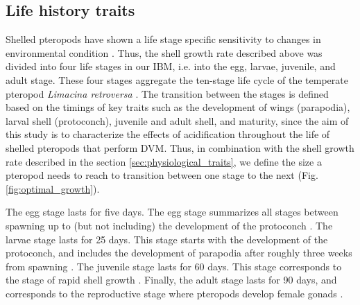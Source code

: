     
       
    


\subsection{Life history traits}\label{sec:life_history_traits}

Shelled pteropods have shown a  life stage specific sensitivity to changes in environmental condition \citep{Thabet2015Lifestages,Bednarsek2016CumulativeEffects}. Thus, the shell growth rate described above was divided into four life stages in our IBM, i.e. into the egg, larvae, juvenile, and adult stage. These four stages aggregate the ten-stage life cycle of the temperate pteropod \textit{Limacina retroversa} \citep{Howes2014Lab,Thabet2015Lifestages}. The transition between the stages is defined based on the timings of key traits such as the development of wings (parapodia), larval shell (protoconch), juvenile and adult shell, and maturity, since the aim of this study is to characterize the effects of acidification throughout the life of shelled pteropods that perform DVM. Thus, in combination with the shell growth rate described in the section \ref{sec:physiological_traits}, we define the size a pteropod needs to reach to transition between one stage to the next (Fig. \ref{fig:optimal_growth}).


The egg stage lasts for five days. The egg stage summarizes all stages between spawning up to (but not including) the development of the protoconch \citep{Thabet2015Lifestages}. The larvae stage lasts for 25 days. This stage starts with the development of the protoconch, and includes the development of parapodia after roughly three weeks from spawning \citep{Thabet2015Lifestages}. The juvenile stage lasts for 60 days. This stage corresponds to the stage of rapid shell growth \citep{Thabet2015Lifestages}. Finally, the adult stage lasts for 90 days, and corresponds to the reproductive stage where pteropods develop female gonads \cite{lalli1989pelagic,Thabet2015Lifestages,Bednarsek2016CumulativeEffects}.


